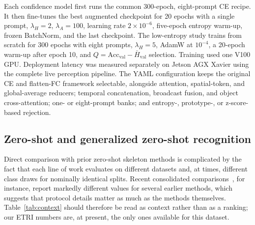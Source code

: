 \documentclass[conference]{IEEEtran}
\begin{document}
Each confidence model first runs the common 300-epoch, eight-prompt CE recipe.
It then fine-tunes the best augmented checkpoint for 20 epochs with a single
prompt, $\lambda_H=2$, $\lambda_A=100$, learning rate
$2\times10^{-6}$, five-epoch entropy warm-up, frozen BatchNorm, and the last
checkpoint. The low-entropy study trains from scratch for 300 epochs with eight
prompts, $\lambda_H=5$, AdamW at $10^{-4}$, a 20-epoch warm-up after epoch 10,
and $Q=\mathrm{Acc}_{\mathrm{val}}-\bar H_{\mathrm{val}}$ selection. Training
used one V100 GPU. Deployment latency was measured separately on Jetson AGX
Xavier using the complete live perception pipeline.
The YAML configuration keeps the original CE and flatten-FC framework
selectable, alongside attention, spatial-token, and global-average reducers;
temporal concatenation, broadcast fusion, and object cross-attention; one- or
eight-prompt banks; and entropy-, prototype-, or z-score-based rejection.

\subsection{Zero-shot and generalized zero-shot recognition}
Direct comparison with prior zero-shot skeleton methods is complicated by the
fact that each line of work evaluates on different datasets and, at times,
different class draws for nominally identical splits. Recent consolidated
comparisons~\cite{wang2026skeletoncontext}, for instance, report markedly
different values for several earlier methods, which suggests that
protocol details matter as much as the methods themselves. Table~\ref{tab:context}
should therefore be read as context rather than as a ranking; our ETRI numbers
are, at present, the only ones available for this dataset.
\end{document}

